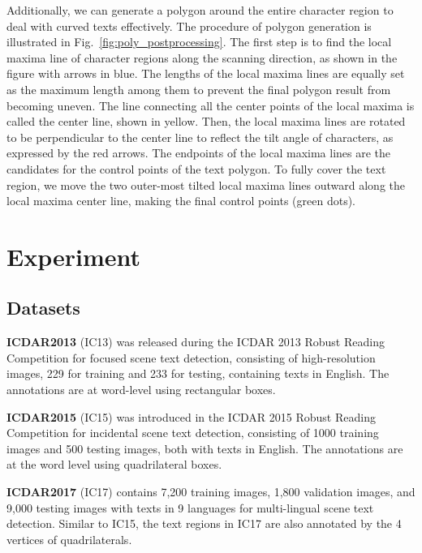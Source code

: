 \documentclass[10pt,twocolumn,letterpaper]{article}
\begin{document}
Additionally, we can generate a polygon around the entire character region to deal with curved texts effectively. The procedure of polygon generation is illustrated in Fig.~\ref{fig:poly_postprocessing}. 
The first step is to find the local maxima line of character regions along the scanning direction, as shown in the figure with arrows in blue. The lengths of the local maxima lines are equally set as the maximum length among them to prevent the final polygon result from becoming uneven. The line connecting all the center points of the local maxima is called the center line, shown in yellow. Then, the local maxima lines are rotated to be perpendicular to the center line to reflect the tilt angle of characters, as expressed by the red arrows. The endpoints of the local maxima lines are the candidates for the control points of the text polygon. To fully cover the text region, we move the two outer-most tilted local maxima lines outward along the local maxima center line, making the final control points (green dots).

 \section{Experiment}


\subsection{Datasets}





\noindent\textbf{ICDAR2013} (IC13) was released during the ICDAR 2013 Robust Reading Competition for focused scene text detection, consisting of high-resolution images, 229 for training and 233 for testing, containing texts in English. The annotations are at word-level using rectangular boxes.



\noindent\textbf{ICDAR2015} (IC15) was introduced in the ICDAR 2015 Robust Reading Competition for incidental scene text detection, consisting of 1000 training images and 500 testing images, both with texts in English. The annotations are at the word level using quadrilateral boxes.



\noindent\textbf{ICDAR2017} (IC17) contains 7,200 training images, 1,800 validation images, and 9,000 testing images with texts in 9 languages for multi-lingual scene text detection. Similar to IC15, the text regions in IC17 are also annotated by the 4 vertices of quadrilaterals.
\end{document}

